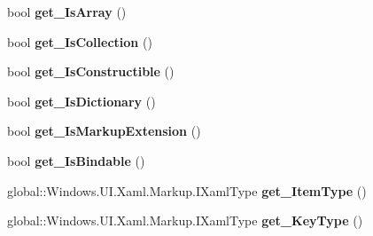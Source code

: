 \begin{DoxyCompactItemize}
bool {\bfseries get\+\_\+\+Is\+Array} ()
\item 
\mbox{\label{interface_windows_1_1_u_i_1_1_xaml_1_1_markup_1_1_i_xaml_type_a979e0b0e073ddfb9b26002ca80cd7af7}} 
bool {\bfseries get\+\_\+\+Is\+Collection} ()
\item 
\mbox{\label{interface_windows_1_1_u_i_1_1_xaml_1_1_markup_1_1_i_xaml_type_a36b2295d77f635d1f86673a460235f92}} 
bool {\bfseries get\+\_\+\+Is\+Constructible} ()
\item 
\mbox{\label{interface_windows_1_1_u_i_1_1_xaml_1_1_markup_1_1_i_xaml_type_a3508951681e7a45a895f3449fdda3a7c}} 
bool {\bfseries get\+\_\+\+Is\+Dictionary} ()
\item 
\mbox{\label{interface_windows_1_1_u_i_1_1_xaml_1_1_markup_1_1_i_xaml_type_aeee5bbd4f909ca50e0b2821c7b7da4e4}} 
bool {\bfseries get\+\_\+\+Is\+Markup\+Extension} ()
\item 
\mbox{\label{interface_windows_1_1_u_i_1_1_xaml_1_1_markup_1_1_i_xaml_type_a5d6ca2d2a8d5159df65277d6bc82b6ca}} 
bool {\bfseries get\+\_\+\+Is\+Bindable} ()
\item 
\mbox{\label{interface_windows_1_1_u_i_1_1_xaml_1_1_markup_1_1_i_xaml_type_a40ca59f3944675e6cdafc7f84915777e}} 
global\+::\+Windows.\+U\+I.\+Xaml.\+Markup.\+I\+Xaml\+Type {\bfseries get\+\_\+\+Item\+Type} ()
\item 
\mbox{\label{interface_windows_1_1_u_i_1_1_xaml_1_1_markup_1_1_i_xaml_type_adf5ffe349502daca52cf3769f1c7826b}} 
global\+::\+Windows.\+U\+I.\+Xaml.\+Markup.\+I\+Xaml\+Type {\bfseries get\+\_\+\+Key\+Type} ()
\item 
\mbox{\label{interface_windows_1_1_u_i_1_1_xaml_1_1_markup_1_1_i_xaml_type_a83f6b45dec1d61427a84b05e9ba9dbfd}} 

\end{DoxyCompactItemize}
